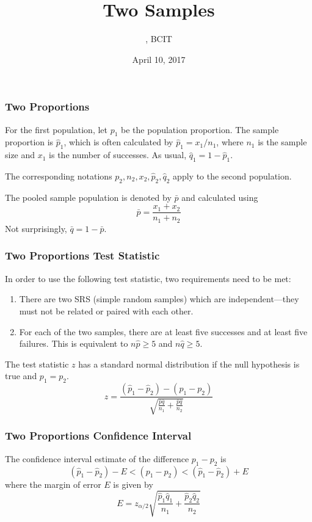 \documentclass[xcolor=dvipsnames]{beamer}
\title{Two Samples}
\subtitle{{\CourseNumber}, BCIT}
\author{\CourseName}
\date{April 10, 2017}
\begin{document}
\begin{frame}
  \titlepage
\end{frame}

\begin{frame}
  \frametitle{Two Proportions}
  For the first population, let $p_{1}$ be the population proportion.
  The sample proportion is $\hat{p}_{1}$, which is often calculated by
  $\hat{p}_{1}=x_{1}/n_{1}$, where $n_{1}$ is the sample size and
  $x_{1}$ is the number of successes. As usual,
  $\hat{q}_{1}=1-\hat{p}_{1}$.

\bigskip

  The corresponding notations
  $p_{2},n_{2},x_{2},\hat{p}_{2},\hat{q}_{2}$ apply to the second
  population.

\bigskip

  The \alert{pooled sample population} is denoted by $\bar{p}$ and
  calculated using
  \begin{equation}
    \label{eq:eefuashi}
    \bar{p}=\frac{x_{1}+x_{2}}{n_{1}+n_{2}}
  \end{equation}
Not surprisingly, $\bar{q}=1-\bar{p}$.
\end{frame}

\begin{frame}
  \frametitle{Two Proportions Test Statistic}
  In order to use the following test statistic, two requirements need
  to be met:
  \begin{enumerate}
  \item There are two SRS (simple random samples) which are
    \alert{independent}---they must not be related or paired with each
    other.
  \item For each of the two samples, there are at least five successes
    and at least five failures. This is equivalent to
    $n\hat{p}\geq{}5$ and $n\hat{q}\geq{}5$.
  \end{enumerate}
The test statistic $z$ has a standard normal distribution if the null
hypothesis is true and $p_{1}=p_{2}$.
\begin{equation}
  \label{eq:ewahgada}
  z=\frac{(\hat{p}_{1}-\hat{p}_{2})-(p_{1}-p_{2})}{\sqrt{\frac{\bar{p}\bar{q}}{n_{1}}+\frac{\bar{p}\bar{q}}{n_{2}}}}
\end{equation}
\end{frame}

\begin{frame}
  \frametitle{Two Proportions Confidence Interval}
  The confidence interval estimate of the difference $p_{1}-p_{2}$ is
  \begin{equation}
    \label{eq:uobaikam}
    (\hat{p}_{1}-\hat{p}_{2})-E<(p_{1}-p_{2})<(\hat{p}_{1}-\hat{p}_{2})+E
  \end{equation}
where the margin of error $E$ is given by
\begin{equation}
  \label{eq:eipoosoo}
  E=z_{\alpha/2}\sqrt{\frac{\hat{p}_{1}\hat{q}_{1}}{n_{1}}+\frac{\hat{p}_{2}\hat{q}_{2}}{n_{2}}}
\end{equation}
\end{frame}
\end{document}
